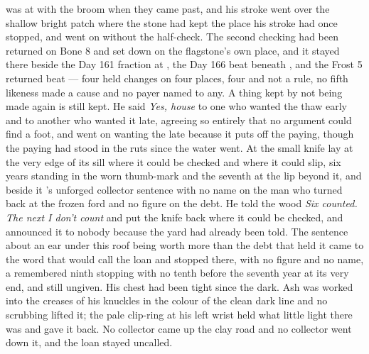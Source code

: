  was at  with the broom when they came past, and his stroke went over the shallow bright patch where the stone had kept the place his stroke had once stopped, and went on without the half-check. The second checking had been returned on Bone 8 and set down on the flagstone's own place, and it stayed there beside the Day 161 fraction at , the Day 166 beat beneath , and the Frost 5 returned beat --- four held changes on four places, four and not a rule, no fifth likeness made a cause and no payer named to any. A thing kept by not being made again is still kept. He said \emph{Yes, house} to one who wanted the thaw early and to another who wanted it late, agreeing so entirely that no argument could find a foot, and went on wanting the late because it puts off the paying, though the paying had stood in the ruts since the water went. At  the small knife lay at the very edge of its sill where it could be checked and where it could slip, six years standing in the worn thumb-mark and the seventh at the lip beyond it, and beside it 's unforged collector sentence with no name on the man who turned back at the frozen ford and no figure on the debt. He told the wood \emph{Six counted. The next I don't count} and put the knife back where it could be checked, and announced it to nobody because the yard had already been told. The sentence about an ear under this roof being worth more than the debt that held it came to the word that would call the loan and stopped there, with no figure and no name, a remembered ninth stopping with no tenth before the seventh year at its very end, and still ungiven. His chest had been tight since the dark. Ash was worked into the creases of his knuckles in the colour of the clean dark line and no scrubbing lifted it; the pale clip-ring at his left wrist held what little light there was and gave it back. No collector came up the clay road and no collector went down it, and the loan stayed uncalled.

